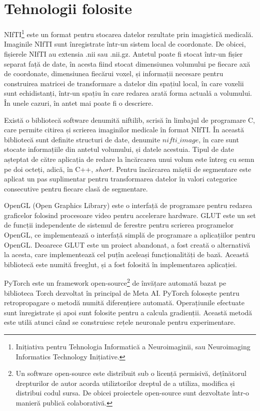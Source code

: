 
\section{Tehnologii folosite}

NIfTI\footnote{Inițiativa pentru Tehnologia Informatică a Neuroimaginii, sau Neuroimaging Informatics Technology Inițiative.} este un format pentru stocarea datelor rezultate prin imagistică medicală. Imaginile NIfTI sunt înregistrate într-un sistem local de coordonate. De obicei, fișierele NIfTI au extensia .nii sau .nii.gz. Antetul poate fi stocat într-un fișier separat față de date, în acesta fiind stocat dimensiunea volumului pe fiecare axă de coordonate, dimensiunea fiecărui voxel, și informații necesare pentru construirea matricei de transformare a datelor din spațiul local, în care voxelii sunt echidistanți, într-un spațiu în care redarea arată forma actuală a volumului. În unele cazuri, în antet mai poate fi o descriere.

Există o bibliotecă software denumită niftilib, scrisă în limbajul de programare C, care permite citirea și scrierea imaginilor medicale în format NIfTI. În această bibliotecă sunt definite structuri de date, denumite $nifti\_image$, în care sunt stocate informațiile din antetul volumului, și datele acestuia. Tipul de date așteptat de către aplicația de redare la încărcarea unui volum este întreg cu semn pe doi octeți, adică, în C++, $short$. Pentru încărcarea măștii de segmentare este aplicat un pas suplimentar pentru transformarea datelor în valori categorice consecutive pentru fiecare clasă de segmentare.


OpenGL (Open Graphics Library) este o interfață de programare pentru redarea graficelor folosind procesoare video pentru accelerare hardware. GLUT este un set de funcții independente de sistemul de ferestre pentru scrierea programelor OpenGL, ce implementează o interfață simplă de programare a aplicațiilor pentru OpenGL. Deoarece GLUT este un proiect abandonat, a fost creată o alternativă la acesta, care implementează cel puțîn aceleași funcționalități de bază. Această bibliotecă este numită freeglut, și a fost folosită în implementarea aplicației.


PyTorch este un framework open-source\footnote{Un software open-source este distribuit sub o licență permisivă, dețînătorul drepturilor de autor acorda utiliztorilor dreptul de a utiliza, modifica și distribui codul sursa. De obicei proiectele open-source sunt dezvoltate într-o manieră publică colaborativă.} de învățare automată bazat pe biblioteca Torch dezvoltat în principal de Meta AI. PyTorch folosește pentru retropropagare o metodă numită diferențiere automată. Operațiunile efectuate sunt înregistrate și apoi sunt folosite pentru a calcula gradienții. Această metodă este utilă atunci când se construiesc rețele neuronale pentru experimentare.

